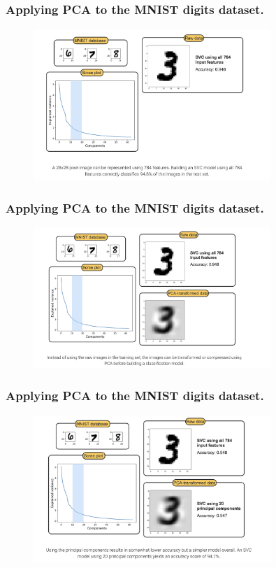 \documentclass[8pt,dvipsnames]{beamer}
\begin{document}
\begin{frame}
    \frametitle{Applying PCA to the MNIST digits dataset.}
    \begin{figure}[ht]
        \centering
        \includegraphics[width=0.8\textwidth]{imgs/DR_8.png}
    \end{figure}
\end{frame}

\begin{frame}
    \frametitle{Applying PCA to the MNIST digits dataset.}
    \begin{figure}[ht]
        \centering
        \includegraphics[width=0.8\textwidth]{imgs/DR_9.png}
    \end{figure}
\end{frame}

\begin{frame}
    \frametitle{Applying PCA to the MNIST digits dataset.}
    \begin{figure}[ht]
        \centering
        \includegraphics[width=0.8\textwidth]{imgs/DR_10.png}
    \end{figure}
\end{frame}
\end{document}
